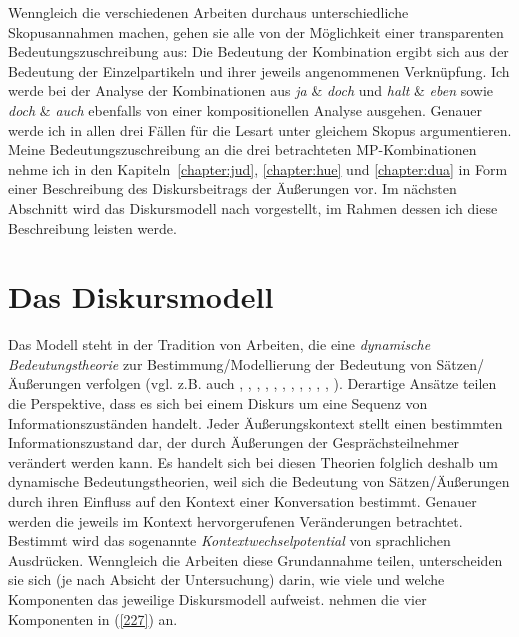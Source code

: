 \noindent
Wenngleich die verschiedenen Arbeiten durchaus unterschiedliche Skopusannahmen machen, gehen sie alle von der Möglichkeit einer transparenten Bedeutungszuschreibung aus: Die Bedeutung der Kombination ergibt sich aus der Bedeutung der Einzelpartikeln und ihrer jeweils angenommenen Verknüpfung. Ich werde bei der Analyse der Kombinationen aus \textit{ja} \& \textit{doch} und \textit{halt} \& \textit{eben} sowie \textit{doch} \& \textit{auch} ebenfalls von einer kompositionellen Analyse ausgehen. Genauer werde ich in allen drei Fällen für die Lesart unter gleichem Skopus argumentieren.\\

\noindent
Meine Bedeutungszuschreibung an die drei betrachteten MP-Kombinationen neh\-me ich in den Kapiteln~\ref{chapter:jud}, \ref{chapter:hue} und \ref{chapter:dua} in Form einer Beschreibung des Diskursbeitrags der Äußerungen vor. Im nächsten Abschnitt wird das Diskursmodell nach \citet{Farkas2010} vorgestellt, im Rahmen dessen ich diese Beschreibung leisten werde.

\section{Das Diskursmodell}
\label{sec:diskursmodell}
Das Modell steht in der Tradition von Arbeiten, die eine \textit{dynamische Bedeutungstheorie}  zur Bestimmung/Modellierung der Bedeutung von Sätzen/Äußerungen verfolgen (vgl. z.B. auch \citealt{Hamblin1971}, \citealt{Stalnaker1978}, \citealt{Ginzburg1996}, \citealt{Roberts1996}, \citealt{Giannakidou1998}, \citealt{Bartels1999}, \citealt{Stalnaker2002}, \citealt{Buering2003}, \citealt{Farkas2003}, \citealt{Gunlogson2003}, \citealt{Caponigro2007}, \citealt{Malamud2011}). Derartige Ansätze teilen die Perspektive, dass es sich bei einem Diskurs um eine Sequenz von Informationszuständen handelt. Jeder Äußerungskontext stellt einen bestimmten Informationszustand dar, der durch Äußerungen der Gesprächsteil\-nehmer verändert werden kann. Es handelt sich bei diesen Theorien folglich deshalb um dynamische Bedeutungstheorien, weil sich die Bedeutung von Sätzen/Äußerungen durch ihren Einfluss auf den Kontext einer Konversation bestimmt. Genauer werden die jeweils im Kontext hervorgerufenen Veränderungen betrachtet. Bestimmt wird das sogenannte \textit{Kontextwechselpotential}  von sprachlichen Ausdrücken. Wenngleich die Arbeiten diese Grundannahme teilen, unterscheiden sie sich (je nach Absicht der Untersuchung) darin, wie viele und welche Komponenten das jeweilige Diskursmodell aufweist. \citet{Farkas2010} nehmen die vier Komponenten in (\ref{227}) an.

